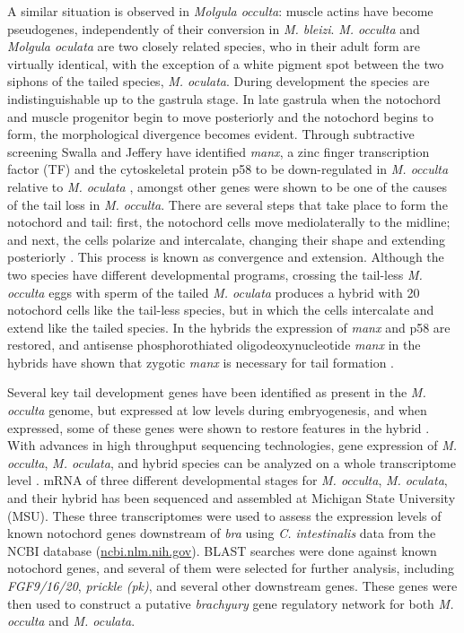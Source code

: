 A similar situation is observed in \textit{Molgula occulta}: muscle actins have become pseudogenes, independently of their conversion in \textit{M. bleizi}. \textit{M. occulta} and \textit{Molgula oculata} are two closely related species, who in their adult form are virtually identical, with the exception of a white pigment spot between the two siphons of the tailed species, \textit{M. oculata}. During development the species are indistinguishable up to the gastrula stage. In late gastrula when the notochord and muscle progenitor begin to move posteriorly \cite{swalla_novel_1993} and the notochord begins to form, the morphological divergence becomes evident. Through subtractive screening Swalla and Jeffery \cite{swalla_requirement_1996} have identified \textit{manx}, a zinc finger transcription factor (TF) and the cytoskeletal protein p58 to be down-regulated in \textit{M. occulta} relative to \textit{M. oculata} \cite{swalla_identification_1991}, amongst other genes were shown to be one of the causes of the tail loss in \textit{M. occulta}. There are several steps that take place to form the notochord and tail: first, the notochord cells move mediolaterally to the midline; and next, the cells polarize and intercalate, changing their shape and extending posteriorly \cite{keller_mechanisms_2000, jiang_ascidian_2005,stemple_structure_2005}. This process is known as convergence and extension. Although the two species have different developmental programs, crossing the tail-less \textit{M. occulta} eggs with sperm of the tailed \textit{M. oculata} produces a hybrid with 20 notochord cells like the tail-less species, but in which the cells intercalate and extend like the tailed species. In the hybrids the expression of \textit{manx} and p58 are restored, and antisense phosphorothiated oligodeoxynucleotide \textit{manx} in the hybrids have shown that zygotic \textit{manx} is necessary for tail formation \cite{swalla_requirement_1996}.

Several key tail development genes have been identified as present in the \textit{M. occulta} genome, but expressed at low levels during embryogenesis, and when expressed, some of these genes were shown to restore features in the hybrid \cite{swalla_interspecific_1990,jeffery_factors_1992,swalla_novel_1993, swalla_requirement_1996}. With advances in high throughput sequencing technologies, gene expression of \textit{M. occulta}, \textit{M. oculata}, and hybrid species can be analyzed on a whole transcriptome level \cite{gyoja_analysis_2007,pickrell_variation_2010}. mRNA of three different developmental stages for \textit{M. occulta}, \textit{M. oculata}, and their hybrid has been sequenced and assembled at Michigan State University (MSU). These three transcriptomes were used to %
assess the expression levels of known notochord genes downstream of \textit{bra} using \textit{C. intestinalis} data from the NCBI database (\url{ncbi.nlm.nih.gov}). BLAST searches were done against known notochord genes, and several of them were selected for further analysis, including \textit{FGF9/16/20}, \textit{prickle (pk)}, and several other downstream genes.  These genes were then used to construct a putative \textit{brachyury} gene regulatory network for both \textit{M. occulta} and \textit{M. oculata}. 

